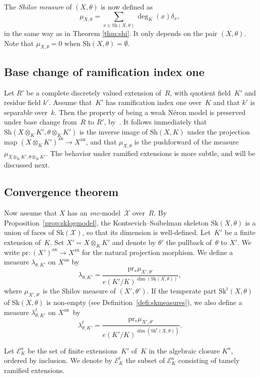 \documentclass[11pt]{article}
\let\mathcal\mathscr
\theoremstyle{definition}
\numberwithin{equation}{subsection}
\newcommand{\cX}{\ensuremath{\mathscr{X}}}
\newcommand{\snc}{\textit{snc}}
\newcommand{\an}{\mathrm{an}}
\newcommand{\pr}{\mathrm{pr}}
\newcommand{\Sh}{\mathrm{Sh}}
\newcommand{\Sk}{\mathrm{Sk}}
\let\form\theta
\begin{document}
The \emph{Shilov measure} of $(X,\form)$ is now defined as
\begin{equation*}
\mu_{X,\form}=\sum_{x\in \Sh(X,\form)}\deg_K(x) \delta_x,
\end{equation*}
in the same way as in Theorem \ref{thm:shi}.
It only depends on the pair $(X,\form)$.
Note that $\mu_{X,\form}=0$ when $\Sh(X,\form)=\emptyset$.

\subsection{Base change of ramification index one}
Let $R'$ be a complete discretely valued extension of~$R$, with quotient field~$K'$ and residue field $k'$. Assume that~$K'$ has ramification index one over~$K$ and that $k'$ is separable over~$k$. Then the property of being a weak Néron model is preserved under base change from~$R$ to $R'$, by~\cite[3.6/7]{BLR}.
It follows immediately that $\Sh(X\otimes_K K',\form\otimes_K K')$ is the inverse image of $\Sh(X,K)$ under the projection map
$(X\otimes_K K')^{\an}\to X^{\an}$, and that $\mu_{X,\form}$ is the pushforward of the measure $\mu_{X\otimes_K K',\form\otimes_K K'}$.
The behavior under ramified extensions is more subtle, and will be discussed next.

\subsection{Convergence theorem}
Now assume that $X$ has an \snc-model~$\cX$ over~$R$.
By Proposition~\ref{prop:sklogmodel}, the Kontsevich--Soibelman skeleton $\Sk(X,\form)$ is a union of faces of $\Sk(\cX)$, so that its dimension is well-defined.
Let~$K'$ be a finite extension of~$K$. Set $X'=X\otimes_K K'$ and denote by $\form'$ the pullback of~$\form$ to $X'$. We write $\pr\colon (X')^{\an}\to X^{\an}$ for the natural projection morphism. We define a measure $\lambda_{\form,K'}$ on $X^{\an}$ by
\[
\lambda_{\form,K'}=\frac{\pr_\ast\mu_{X',\form'}}{e(K'/K)^{\dim(\Sk(X,\form))}},
\]
where $\mu_{X',\form'}$ is the Shilov measure of $(X',\form')$.
If the temperate part $\Sk^t(X,\form)$ of $\Sk(X,\form)$ is non-empty (see Definition~\ref{defi:skmeasures}), we also define a measure $\lambda^t_{\form,K'}$ on $X^{\an}$~by
\[
\lambda^t_{\form,K'}=\frac{\pr_\ast\mu_{X',\form'}}{e(K'/K)^{\dim(\Sk^t(X,\form))}}.
\]

Let $\mathcal{E}^a_K$ be the set of finite extensions~$K'$ of~$K$ in the algebraic closure $K^a$, ordered by inclusion. We denote by
$\mathcal{E}^t_K$ the subset of $\mathcal{E}^a_K$ consisting of tamely ramified extensions.
\end{document}
